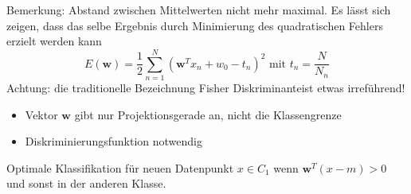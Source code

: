 	Bemerkung: Abstand zwischen Mittelwerten nicht mehr maximal. Es lässt sich zeigen, dass das selbe Ergebnis durch Minimierung des quadratischen Fehlers erzielt werden kann
	\begin{equation*}
		E(\pmb{w}) = \frac{1}{2}\sum_{n=1}^N(\pmb{w}^Tx_n +w_0 -t_n)^2 \text{ mit } t_n = \frac{N}{N_n}
	\end{equation*}
	Achtung: die traditionelle Bezeichnung \dq Fisher Diskriminante\dq ist etwas irreführend!
	\begin{itemize}
		\item Vektor $\pmb{w}$ gibt nur Projektionsgerade an, nicht die Klassengrenze
		\item Diskriminierungsfunktion notwendig
	\end{itemize}
	Optimale Klassifikation für neuen Datenpunkt $x \in C_1$ wenn $\pmb{w}^T(x-m)>0$ und sonst in der anderen Klasse.
